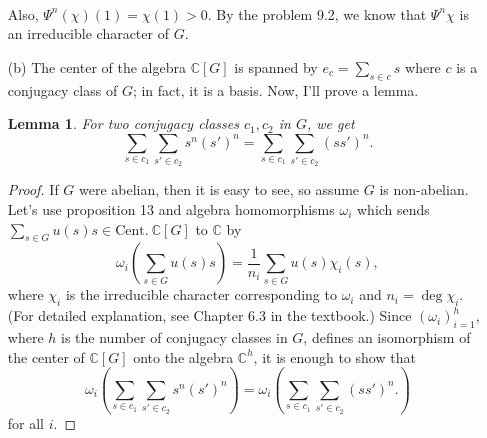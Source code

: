 \documentclass[a4paper, 12pt]{article}
\theoremstyle{Mydefinition}
\theoremstyle{Mytheorem}
\newtheorem{lemma}[statement]{Lemma}
\begin{document}
\begin{enumerate}
\begin{equation}
\begin{split}
\end{split}
\end{equation}
Also, $\Psi^n(\chi)(1)=\chi(1)>0$. By the problem 9.2, we know that $\Psi^n\chi$ is an irreducible character of $G$.
\item[(b)] The center of the algebra $\mathbb{C}[G]$ is spanned by $e_c=\sum_{s\in c}s$ where $c$ is a conjugacy class of $G$; in fact, it is a basis. Now, I'll prove a lemma.
\begin{lemma}
For two conjugacy classes $c_1,c_2$ in $G$, we get
\begin{equation}
    \sum_{s\in c_1}\sum_{s'\in c_2}s^n(s')^n = \sum_{s\in c_1}\sum_{s'\in c_2}(ss')^n.
\end{equation}
\end{lemma}
\begin{proof}
If $G$ were abelian, then it is easy to see, so assume $G$ is non-abelian. Let's use proposition 13 and algebra homomorphisms $\omega_i$ which sends $\sum_{s\in G}u(s)s\in \mathrm{Cent.}~\mathbb{C}[G]$ to $\mathbb{C}$ by
\begin{equation}
    \omega_i\left(\sum_{s\in G}u(s)s\right) = \frac{1}{n_i}\sum_{s\in G}u(s)\chi_i(s),
\end{equation}
where $\chi_i$ is the irreducible character corresponding to $\omega_i$ and $n_i=\deg \chi_i$. (For detailed explanation, see Chapter 6.3 in the textbook.) Since $(\omega_i)_{i=1}^h$, where $h$ is the number of conjugacy classes in $G$, defines an isomorphism of the center of $\mathbb{C}[G]$ onto the algebra $\mathbb{C}^h$, it is enough to show that 
\begin{equation}\label{HW10:Eq:11}
    \omega_i\left(\sum_{s\in c_1}\sum_{s'\in c_2}s^n(s')^n\right) = \omega_i\left(\sum_{s\in c_1}\sum_{s'\in c_2}(ss')^n.\right)
\end{equation}
for all $i$.


\end{proof}
\end{enumerate}
\end{document}
